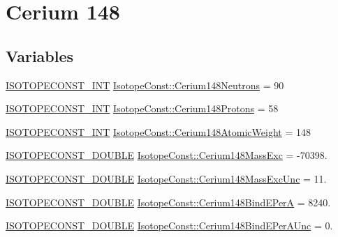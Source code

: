 \hypertarget{group___isotope_const-_cerium-_ce148}{}\section{Cerium 148}
\label{group___isotope_const-_cerium-_ce148}
\subsection*{Variables}
\begin{DoxyCompactItemize}
\item 
\mbox{\hyperlink{group___isotope_const-_macros_ga5f18360b3e99483a35c32d789e62621c}{I\+S\+O\+T\+O\+P\+E\+C\+O\+N\+S\+T\+\_\+\+I\+NT}} \mbox{\hyperlink{group___isotope_const-_cerium-_ce148_gadc0bebd1d44196413166442ee4686307}{Isotope\+Const\+::\+Cerium148\+Neutrons}} = 90
\item 
\mbox{\hyperlink{group___isotope_const-_macros_ga5f18360b3e99483a35c32d789e62621c}{I\+S\+O\+T\+O\+P\+E\+C\+O\+N\+S\+T\+\_\+\+I\+NT}} \mbox{\hyperlink{group___isotope_const-_cerium-_ce148_gaca00db243952ad1b87e8e66bacb73f56}{Isotope\+Const\+::\+Cerium148\+Protons}} = 58
\item 
\mbox{\hyperlink{group___isotope_const-_macros_ga5f18360b3e99483a35c32d789e62621c}{I\+S\+O\+T\+O\+P\+E\+C\+O\+N\+S\+T\+\_\+\+I\+NT}} \mbox{\hyperlink{group___isotope_const-_cerium-_ce148_ga01fac120fe86b7199db421fc123e778f}{Isotope\+Const\+::\+Cerium148\+Atomic\+Weight}} = 148
\item 
\mbox{\hyperlink{group___isotope_const-_macros_ga8f45a7272ce02c0b4c65c44636ed719a}{I\+S\+O\+T\+O\+P\+E\+C\+O\+N\+S\+T\+\_\+\+D\+O\+U\+B\+LE}} \mbox{\hyperlink{group___isotope_const-_cerium-_ce148_ga87c3184e8636ca225af37f1b596f464e}{Isotope\+Const\+::\+Cerium148\+Mass\+Exc}} = -\/70398.
\item 
\mbox{\hyperlink{group___isotope_const-_macros_ga8f45a7272ce02c0b4c65c44636ed719a}{I\+S\+O\+T\+O\+P\+E\+C\+O\+N\+S\+T\+\_\+\+D\+O\+U\+B\+LE}} \mbox{\hyperlink{group___isotope_const-_cerium-_ce148_ga1db3fbcb5e5bb27dfe509005ec6cbbdf}{Isotope\+Const\+::\+Cerium148\+Mass\+Exc\+Unc}} = 11.
\item 
\mbox{\hyperlink{group___isotope_const-_macros_ga8f45a7272ce02c0b4c65c44636ed719a}{I\+S\+O\+T\+O\+P\+E\+C\+O\+N\+S\+T\+\_\+\+D\+O\+U\+B\+LE}} \mbox{\hyperlink{group___isotope_const-_cerium-_ce148_ga64cc60d54f119a36913ac0b17c959d9d}{Isotope\+Const\+::\+Cerium148\+Bind\+E\+PerA}} = 8240.
\item 
\mbox{\hyperlink{group___isotope_const-_macros_ga8f45a7272ce02c0b4c65c44636ed719a}{I\+S\+O\+T\+O\+P\+E\+C\+O\+N\+S\+T\+\_\+\+D\+O\+U\+B\+LE}} \mbox{\hyperlink{group___isotope_const-_cerium-_ce148_ga4d38b56a2c9f02d12f02c67aeb7eb92e}{Isotope\+Const\+::\+Cerium148\+Bind\+E\+Per\+A\+Unc}} = 0.

\end{DoxyCompactItemize}
